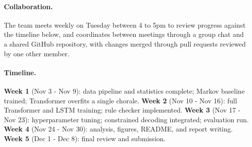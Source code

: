 \documentclass{article}
\begin{document}
\paragraph{Collaboration.} The team meets weekly on Tuesday between 4 to 5pm to review progress against the timeline below, and coordinates between meetings through a group chat and a shared GitHub repository, with changes merged through pull requests reviewed by one other member.

\paragraph{Timeline.}
\textbf{Week 1} (Nov 3 - Nov 9): data pipeline and statistics complete; Markov baseline trained; Transformer overfits a single chorale.
\textbf{Week 2} (Nov 10 - Nov 16): full Transformer and LSTM training; rule checker implemented.
\textbf{Week 3} (Nov 17 - Nov 23): hyperparameter tuning; constrained decoding integrated; evaluation run.
\textbf{Week 4} (Nov 24 - Nov 30): analysis, figures, README, and report writing.
\textbf{Week 5} (Dec 1 - Dec 8): final review and submission.



\end{document}
